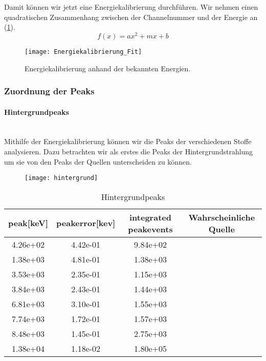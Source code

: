 \documentclass[]{article}
\begin{document}
Damit können wir jetzt eine Energiekalibrierung durchführen. Wir nehmen einen quadratischen Zusammenhang zwischen der Channelnummer und der Energie an (\ref{fig:energiekalibrierung-fit}).
\begin{equation}
	f(x)=ax^2+mx+b
\end{equation}
\begin{figure}
	\centering
	\texttt{[image: Energiekalibrierung\_Fit]}
	\caption{Energiekalibrierung anhand der bekannten Energien.}
	\label{fig:energiekalibrierung-fit}
\end{figure}

\subsubsection{Zuordnung der Peaks}
\paragraph{Hintergrundpeaks}\mbox{} \\
Mithilfe der Energiekalibrierung können wir die Peaks der verschiedenen Stoffe analysieren. Dazu betrachten wir als erstes die Peaks der Hintergrundstrahlung um sie von den Peaks der Quellen unterscheiden zu können.
\begin{figure}[H]
	\centering
	\texttt{[image: hintergrund]}
	\caption{}
	\label{fig:hintergrund}
\end{figure}

\begin{table}[H]
	\centering
	\begin{tabular}{|c|c|c|c|}
		\hline
		peak[keV] & peakerror[kev] & integrated peakevents &Wahrscheinliche Quelle\\ \hline\hline
		4.26e+02 & 4.42e-01 & 9.84e+02 &\\ \hline
		1.38e+03 & 4.81e-01 & 1.38e+03 &\\ \hline
		3.53e+03 & 2.35e-01 & 1.15e+03 &\\ \hline
		3.84e+03 & 2.43e-01 & 1.44e+03 &\\ \hline
		6.81e+03 & 3.10e-01 & 1.55e+03 &\\ \hline
		7.74e+03 & 1.72e-01 & 1.57e+03 &\\ \hline
		8.48e+03 & 1.45e-01 & 2.75e+03 &\\ \hline
		1.38e+04 & 1.18e-02 & 1.80e+05 &\\ \hline

	\end{tabular}
	\caption{Hintergrundpeaks \label{tab:hintergrundpeaks}}
\end{table}
\end{document}
